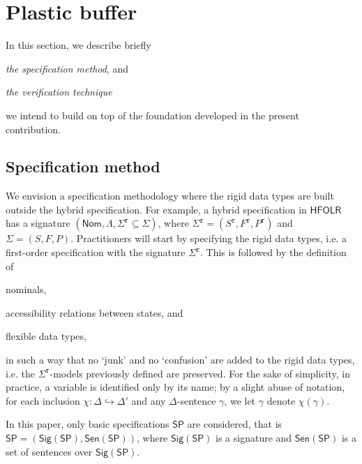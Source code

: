 \documentclass{article}
\newcommand{\HFOLR}{{\mathsf{HFOLR}}}
\newcommand{\Sig}{\mathsf{Sig}}
\newcommand{\Sen}{\mathsf{Sen}}
\newcommand{\Nom}{\mathsf{Nom}}
\newcommand{\rigid}{{\mathtt{r}}}
\newcommand{\SP}{{\mathsf{SP}}}
\begin{document}
\section{Plastic buffer} \label{section:case:study}

In this section, we describe briefly 
\begin{enumerate*}
\item  \emph{the specification method}, and 
\item \emph{the verification technique} 
\end{enumerate*}
we intend to build on top of the foundation developed in the present contribution. 


\subsection{Specification method}

We envision a specification methodology where the rigid data types are built outside the hybrid specification.
For example, a hybrid specification in $\HFOLR$ has a signature $(\Nom,\Lambda,\Sigma^\rigid\subseteq\Sigma)$, where $\Sigma^\rigid=(S^\rigid,F^\rigid,P^\rigid)$ and $\Sigma=(S,F,P)$.
Practitioners will start by specifying the rigid data types, i.e. a first-order specification with the signature $\Sigma^\rigid$. 
This is followed by the definition of 
\begin{enumerate*}[label=(\alph*)]
\item nominals, 
\item accessibility relations between states, and 
\item flexible data types,
\end{enumerate*} 
 in such a way that  no `junk' and no `confusion' are added to the rigid data types, i.e. the $\Sigma^\rigid$-models previously defined are preserved.
 For the sake of simplicity, in practice, a variable is identified only by its name; by a slight abuse of notation, for each inclusion $\chi\colon\Delta\hookrightarrow\Delta'$ and any $\Delta$-sentence $\gamma$, we let $\gamma$ denote $\chi(\gamma)$.
 
 In this paper, only basic specifications $\SP$ are considered, that is $\SP=(\Sig(\SP),\Sen(\SP))$, where $\Sig(\SP)$ is a signature and $\Sen(\SP)$ is a set of sentences over $\Sig(\SP)$.
\end{document}
